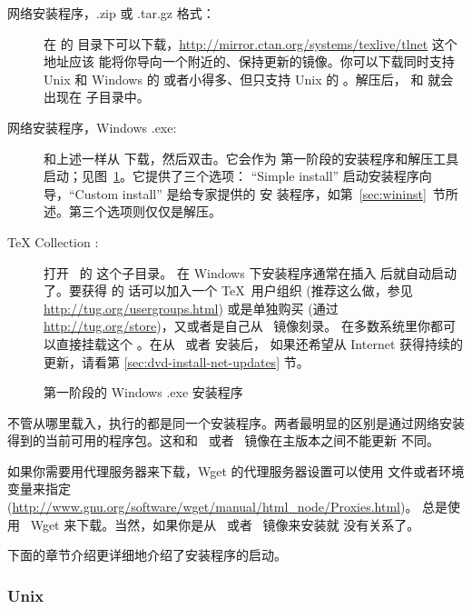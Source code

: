 \documentclass{article}
\begin{document}
\begin{description}
\item [网络安装程序，.zip 或 .tar.gz 格式：] 在 \CTAN 的 
目录下可以下载，\url{http://mirror.ctan.org/systems/texlive/tlnet} 这个地址应该
能将你导向一个附近的、保持更新的镜像。你可以下载同时支持 Unix 和
Windows 的  或者小得多、但只支持 Unix 的
。解压后， 和
 就会出现在  子目录中。

\item[网络安装程序，Windows .exe:] 和上述一样从 \CTAN{} 下载，然后双击。它会作为
第一阶段的安装程序和解压工具启动；见图~\ref{fig:nsis}。它提供了三个选项：
``Simple install'' 启动安装程序向导，``Custom install'' 是给专家提供的 \GUI{} 安
装程序，如第~\ref{sec:wininst}~节所述。第三个选项则仅仅是解压。

\item [\TeX{} Collection \DVD:] 打开 \DVD\ 的  这个子目录。
在 Windows 下安装程序通常在插入 \DVD 后就自动启动了。要获得 \DVD 的
话可以加入一个 \TeX\ 用户组织 (推荐这么做，参见
\url{http://tug.org/usergroups.html}) 或是单独购买 (通过
\url{http://tug.org/store})，又或者是自己从 \ISO\ 镜像刻录。
在多数系统里你都可以直接挂载这个 \ISO{}。在从 \DVD\ 或者 \ISO{} 安装后，
如果还希望从 Internet 获得持续的更新，请看第 \ref{sec:dvd-install-net-updates}
节。

\end{description}

\begin{figure}[tb]
\caption{第一阶段的 Windows .exe 安装程序}\label{fig:nsis}
\end{figure}

不管从哪里载入，执行的都是同一个安装程序。两者最明显的区别是通过网络安装
得到的当前可用的程序包。这和和 \DVD\ 或者 \ISO\ 镜像在主版本之间不能更新
不同。

如果你需要用代理服务器来下载，Wget 的代理服务器设置可以使用 
文件或者环境变量来指定
(\url{http://www.gnu.org/software/wget/manual/html_node/Proxies.html})。
\TL{} 总是使用 \GNU\ Wget 来下载。当然，如果你是从 \DVD\ 或者 \ISO\ 镜像来安装就
没有关系了。

\noindent
下面的章节介绍更详细地介绍了安装程序的启动。

\subsubsection{Unix}
\end{document}
